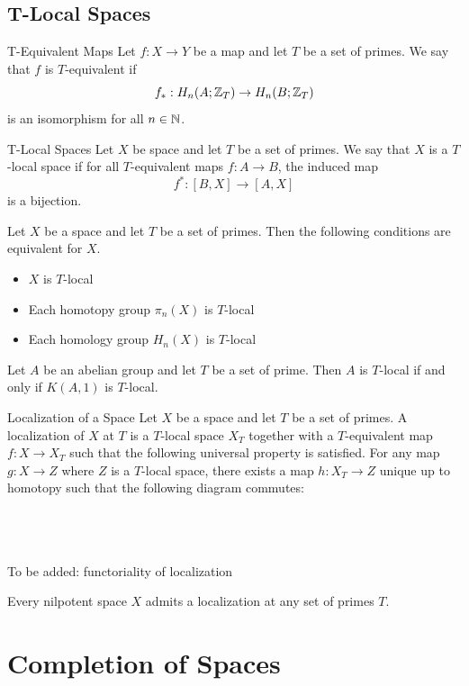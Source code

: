 \documentclass[a4paper]{article}
\begin{document}
\subsection{T-Local Spaces}
\begin{defn}{T-Equivalent Maps}{} Let $f:X\to Y$ be a map and let $T$ be a set of primes. We say that $f$ is $T$-equivalent if $$f_\ast:H_n(A;\mathbb{Z}_T)\to H_n(B;\mathbb{Z}_T)$$ is an isomorphism for all $n\in\mathbb{N}$. 
\end{defn}

\begin{defn}{T-Local Spaces}{} Let $X$ be space and let $T$ be a set of primes. We say that $X$ is a $T$-local space if for all $T$-equivalent maps $f:A\to B$, the induced map $$f^\ast:[B,X]\to[A,X]$$ is a bijection. 
\end{defn}

\begin{thm}{}{} Let $X$ be a space and let $T$ be a set of primes. Then the following conditions are equivalent for $X$. 
\begin{itemize}
\item $X$ is $T$-local
\item Each homotopy group $\pi_n(X)$ is $T$-local
\item Each homology group $H_n(X)$ is $T$-local
\end{itemize}
\end{thm}

\begin{prp}{}{} Let $A$ be an abelian group and let $T$ be a set of prime. Then $A$ is $T$-local if and only if $K(A,1)$ is $T$-local. 
\end{prp}

\begin{defn}{Localization of a Space}{} Let $X$ be a space and let $T$ be a set of primes. A localization of $X$ at $T$ is a $T$-local space $X_T$ together with a $T$-equivalent map $f:X\to X_T$ such that the following universal property is satisfied. For any map $g:X\to Z$ where $Z$ is a $T$-local space, there exists a map $h:X_T\to Z$ unique up to homotopy such that the following diagram commutes: \\~\\
\\~\\
\end{defn}

To be added: functoriality of localization

\begin{thm}{}{} Every nilpotent space $X$ admits a localization at any set of primes $T$. 
\end{thm}

\pagebreak
\section{Completion of Spaces}
\end{document}
